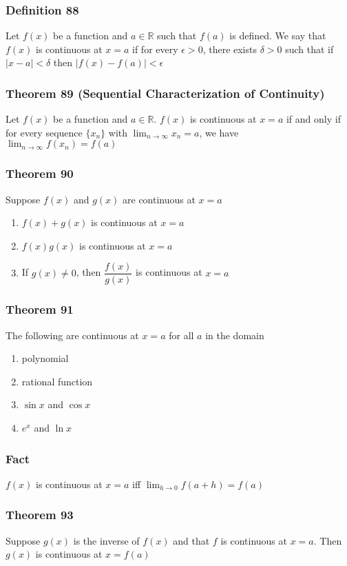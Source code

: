 \documentclass[12pt, letterpaper]{article}
\begin{document}
\subsubsection*{Definition 88}
Let $f(x)$ be a function and $a\in\mathbb{R}$ such that $f(a)$ is defined. We say that $f(x)$ is continuous
at $x=a$ if for every $\epsilon>0$, there exists $\delta>0$ such that if $|x-a| < \delta$ then $|f(x) - f(a)| < \epsilon$
\subsubsection*{Theorem 89 (Sequential Characterization of Continuity)}
Let $f(x)$ be a function and $a\in\mathbb{R}$. $f(x)$ is continuous at $x=a$ if and only if for every sequence $\{x_n\}$
with $\displaystyle\lim_{n\to\infty} x_n = a$, we have $\displaystyle\lim_{n\to\infty} f(x_n) = f(a)$
\subsubsection*{Theorem 90}
Suppose $f(x)$ and $g(x)$ are continuous at $x=a$
\begin{enumerate}
    \item $f(x) + g(x)$ is continuous at $x=a$
    \item $f(x)g(x)$ is continuous at $x=a$
    \item If $g(x) \neq 0$, then $\dfrac{f(x)}{g(x)}$ is continuous at $x=a$
\end{enumerate}
\subsubsection*{Theorem 91}
The following are continuous at $x=a$ for all $a$ in the domain
\begin{enumerate}
    \item polynomial
    \item rational function 
    \item $\sin x$ and $\cos x$
    \item $e^x$ and $\ln x$
\end{enumerate}
\subsubsection*{Fact}
$f(x)$ is continuous at $x=a$ iff $\displaystyle\lim_{h\to 0} f(a+h) = f(a)$
\subsubsection*{Theorem 93}
Suppose $g(x)$ is the inverse of $f(x)$ and that $f$ is continuous at $x=a$. Then $g(x)$ is continuous at $x=f(a)$
\end{document}
